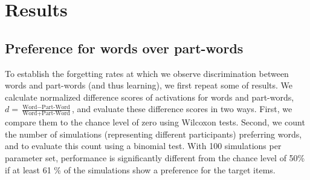 \documentclass[
]{article}
\begin{document}
\clearpage

\hypertarget{results}{%
\section{Results}\label{results}}

\hypertarget{preference-for-words-over-part-words}{%
\subsection{Preference for words over
part-words}\label{preference-for-words-over-part-words}}

To establish the forgetting rates at which we observe discrimination
between words and part-words (and thus learning), we first repeat some
of \citep{Endress-TP-Model} results. We calculate normalized difference
scores of activations for words and part-words,
\(d = \frac{\text{Word} - \text{Part-Word}}{\text{Word} + \text{Part-Word}}\),
and evaluate these difference scores in two ways. First, we compare them
to the chance level of zero using Wilcoxon tests. Second, we count the
number of simulations (representing different participants) preferring
words, and to evaluate this count using a binomial test. With 100
simulations per parameter set, performance is significantly different
from the chance level of 50\% if at least 61 \% of the simulations show
a preference for the target items.
\end{document}
